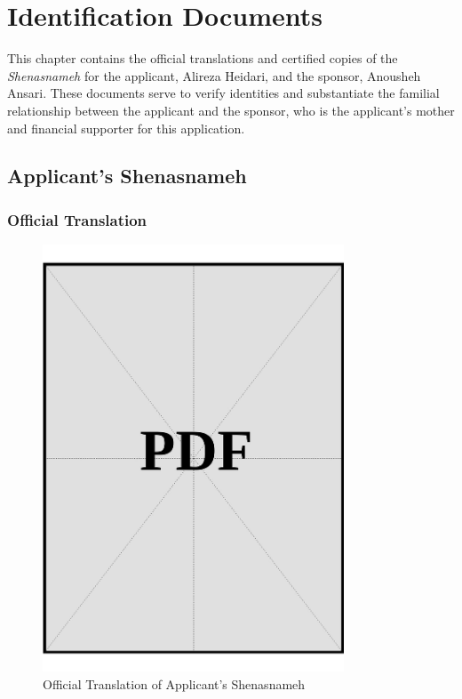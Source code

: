 
\chapter{Identification Documents}\label{sec:identification-documents}

\noindent
This chapter contains the official translations and certified copies of the \textit{Shenasnameh} for the applicant, Alireza Heidari, and the sponsor, Anousheh Ansari. These documents serve to verify identities and substantiate the familial relationship between the applicant and the sponsor, who is the applicant's mother and financial supporter for this application.

\clearpage
\section{Applicant's Shenasnameh}\label{sec:applicant-shenasnameh}

\subsection*{Official Translation}

\vspace*{\fill}
\begin{figure}[h]
    \centering
    \includegraphics[page=1, width=0.8\textwidth]{../docs/applicant/identification/shenasnameh/official-translations.pdf}
    \caption{Official Translation of Applicant's Shenasnameh}
    \label{fig:applicant-shenasnameh-official-translation}
\end{figure}
\vspace*{\fill}

